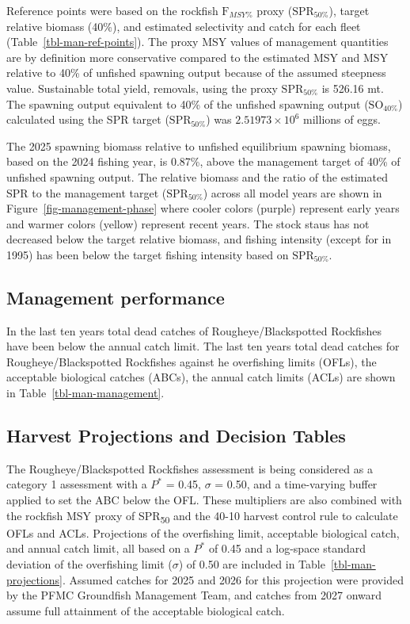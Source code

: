 \documentclass[
]{scrartcl}
\begin{document}
Reference points were based on the rockfish \(\text{F}_{MSY\%}\) proxy
(\(\text{SPR}_{50\%}\)), target relative biomass (40\%), and estimated
selectivity and catch for each fleet (Table~\ref{tbl-man-ref-points}).
The proxy MSY values of management quantities are by definition more
conservative compared to the estimated MSY and MSY relative to 40\% of
unfished spawning output because of the assumed steepness value.
Sustainable total yield, removals, using the proxy \(\text{SPR}_{50\%}\)
is 526.16 mt. The spawning output equivalent to 40\% of the unfished
spawning output (\(\text{SO}_{40\%}\)) calculated using the SPR target
(\(\text{SPR}_{50\%}\)) was \ensuremath{2.51973\times 10^{6}} millions
of eggs.

The 2025 spawning biomass relative to unfished equilibrium spawning
biomass, based on the 2024 fishing year, is 0.87\%, above the management
target of 40\% of unfished spawning output. The relative biomass and the
ratio of the estimated SPR to the management target
(\(\text{SPR}_{50\%}\)) across all model years are shown in
Figure~\ref{fig-management-phase} where cooler colors (purple) represent
early years and warmer colors (yellow) represent recent years. The stock
staus has not decreased below the target relative biomass, and fishing
intensity (except for in 1995) has been below the target fishing
intensity based on \(\text{SPR}_{50\%}\).

\subsection{Management performance}\label{management-performance-1}

In the last ten years total dead catches of Rougheye/Blackspotted
Rockfishes have been below the annual catch limit. The last ten years
total dead catches for Rougheye/Blackspotted Rockfishes against he
overfishing limits (OFLs), the acceptable biological catches (ABCs), the
annual catch limits (ACLs) are shown in Table~\ref{tbl-man-management}.

\subsection{Harvest Projections and Decision
Tables}\label{harvest-projections-and-decision-tables-1}

The Rougheye/Blackspotted Rockfishes assessment is being considered as a
category 1 assessment with a \(P^*\) = 0.45, \(\sigma\) = 0.50, and a
time-varying buffer applied to set the ABC below the OFL. These
multipliers are also combined with the rockfish MSY proxy of
SPR\textsubscript{50} and the 40-10 harvest control rule to calculate
OFLs and ACLs. Projections of the overfishing limit, acceptable
biological catch, and annual catch limit, all based on a \(P^*\) of 0.45
and a log-space standard deviation of the overfishing limit (\(\sigma\))
of 0.50 are included in Table~\ref{tbl-man-projections}. Assumed catches
for 2025 and 2026 for this projection were provided by the PFMC
Groundfish Management Team, and catches from 2027 onward assume full
attainment of the acceptable biological catch.
\end{document}
